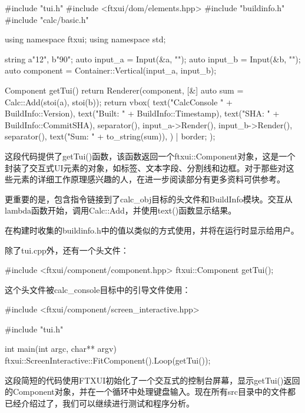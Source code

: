 \begin{cpp}
#include "tui.h"
#include <ftxui/dom/elements.hpp>
#include "buildinfo.h"
#include "calc/basic.h"

using namespace ftxui;
using namespace std;

string a{"12"}, b{"90"};
auto input_a = Input(&a, "");
auto input_b = Input(&b, "");
auto component = Container::Vertical({input_a, input_b});

Component getTui() {
    return Renderer(component, [&] {
        auto sum = Calc::Add(stoi(a), stoi(b));
        return vbox({
            text("CalcConsole " + BuildInfo::Version),
            text("Built: " + BuildInfo::Timestamp),
            text("SHA: " + BuildInfo::CommitSHA),
            separator(),
            input_a->Render(),
            input_b->Render(),
            separator(),
            text("Sum: " + to_string(sum)),
        }) |
        border;
    });
}
\end{cpp}

这段代码提供了getTui()函数，该函数返回一个ftxui::Component对象，这是一个封装了交互式UI元素的对象，如标签、文本字段、分割线和边框。对于那些对这些元素的详细工作原理感兴趣的人，在进一步阅读部分有更多资料可供参考。

更重要的是，包含指令链接到了calc\_obj目标的头文件和BuildInfo模块。交互从lambda函数开始，调用Calc::Add，并使用text()函数显示结果。

在构建时收集的buildinfo.h中的值以类似的方式使用，并将在运行时显示给用户。

除了tui.cpp外，还有一个头文件：


\begin{cpp}
#include <ftxui/component/component.hpp>
ftxui::Component getTui();
\end{cpp}

这个头文件被calc\_console目标中的引导文件使用：


\begin{cpp}
#include <ftxui/component/screen_interactive.hpp>

#include "tui.h"

int main(int argc, char** argv) {
    ftxui::ScreenInteractive::FitComponent().Loop(getTui());
}
\end{cpp}

这段简短的代码使用FTXUI初始化了一个交互式的控制台屏幕，显示getTui()返回的Component对象，并在一个循环中处理键盘输入。现在所有src目录中的文件都已经介绍过了，我们可以继续进行测试和程序分析。


























